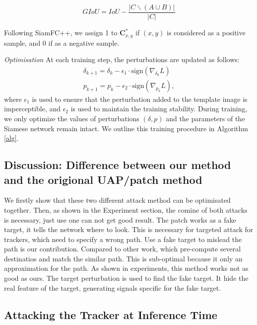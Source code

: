 \documentclass[journal]{IEEEtran}
\begin{document}
\begin{equation}
G I o U=I o U-\frac{|C \backslash(A \cup B)|}{|C|}
\end{equation}

Following SiamFC++, we assign 1 to $\textbf{C}_{x, y}^{*}$ if $(x, y)$ is considered as a positive sample, and 0 if as a negative sample.
  
\textit{Optimisation} At each training step, the perturbations are updated as follows:
\begin{gather}
\delta_{k+1} = \delta_{k} - \epsilon_1 \cdot \text{sign}(\nabla_{\delta_k}L)\\
p_{k+1} = p_{k} - \epsilon_2 \cdot \text{sign}(\nabla_{p_k}L),
\end{gather}
where $\epsilon_1$ is used to ensure that the perturbation added to the template image is imperceptible, and $\epsilon_2$ is used to maintain the training stability.
During training, we only optimize the values of perturbations $(\delta, p)$ and the parameters of the Siamese network remain intact. We outline this training procedure in Algorithm \ref{alg}.

\subsection{Discussion: Difference between our method and the origional UAP/patch method} We firstly show that these two different attack method can be optimisated together. Then, as shown in the Experiment section, the comine of both attacks is necessary, just use one can not get good result. The patch works as a fake target, it tells the network where to look. This is necessary for targeted attack for trackers, which need to specify a wrong path. Use a fake target to mislead the path is our contribution. Compared to other work, which pre-compute several destinatios and match the similar path. This is sub-optimal because it only an approximation for the path. As shown in experiments, this method works not as good as ours. The target perturbation is used to find the fake target. It hide the real feature of the target, generating signals specific for the fake target.

\subsection{Attacking the Tracker at Inference Time}
\end{document}
